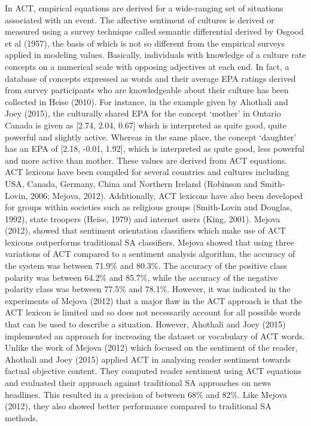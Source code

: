 In ACT, empirical equations are derived for a wide-ranging set of situations associated with an event. The affective sentiment of cultures is derived or measured using a survey technique called semantic differential derived by Osgood et al (1957), the basis of which is not so different from the empirical surveys applied in modeling values. Basically, individuals with knowledge of a culture rate concepts on a numerical scale with opposing adjectives at each end. In fact, a database of concepts expressed as words and their average EPA ratings derived from survey participants who are knowledgeable about their culture has been collected in Heise (2010). For instance, in the example given by Ahothali and Joey (2015), the culturally shared EPA for the concept `mother' in Ontario Canada is given as [2.74, 2.04, 0.67] which is interpreted as quite good, quite powerful and slightly active. Whereas in the same place, the concept `daughter' has an EPA of [2.18, -0.01, 1.92], which is interpreted as quite good, less powerful and more active than mother. These values are derived from ACT equations. ACT lexicons have been compiled for several countries and cultures including USA, Canada, Germany, China and Northern Ireland (Robinson and Smith-Lovin, 2006; Mejova, 2012). Additionally, ACT lexicons have also been developed for groups within societies such as religious groups (Smith-Lovin and Douglas, 1992), state troopers (Heise, 1979) and internet users (King, 2001). Mejova (2012), showed that sentiment orientation classifiers which make use of ACT lexicons outperforms traditional SA classifiers. Mejova showed that using three variations of ACT compared to a sentiment analysis algorithm, the accuracy of the system was between 71.9\% and 80.3\%. The accuracy of the positive class polarity was between 64.2\% and 85.7\%, while the accuracy of the negative polarity class was between 77.5\% and 78.1\%. However, it was indicated in the experiments of Mejova (2012) that a major flaw in the ACT approach is that the ACT lexicon is limited and so does not necessarily account for all possible words that can be used to describe a situation. However, Ahothali and Joey (2015) implemented an approach for increasing the dataset or vocabulary of ACT words. Unlike the work of Mejova (2012) which focused on the sentiment of the reader, Ahothali and Joey (2015) applied ACT in analysing reader sentiment towards factual objective content. They computed reader sentiment using ACT equations and evaluated their approach against traditional SA approaches on news headlines. This resulted in a precision of between 68\% and 82\%. Like Mejova (2012), they also showed better performance compared to traditional SA methods. 


